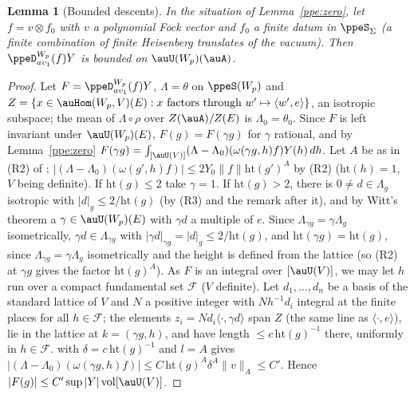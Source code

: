 \documentclass[10pt]{amsart}
\newtheorem{lemma}[theorem]{Lemma}
\theoremstyle{definition}
\theoremstyle{remark}
\begin{document}
\begin{lemma}[Bounded descents]\label{ppe:bdd}
In the situation of Lemma~\textup{\ref{ppe:zero}}, let $f=v\otimes f_0$ with $v$ a polynomial Fock
vector and $f_0$ a finite datum in $\ppeS_\Sigma$ (a finite combination of finite Heisenberg
translates of the vacuum). Then $\ppeD^{W_p}_{a\upsilon_1}(f)Y$ is bounded on $\auU(W_p)(\auA)$.
\end{lemma}
\begin{proof}
Let $F=\ppeD^{W_p}_{a\upsilon_1}(f)Y$, $\Lambda=\theta$ on $\ppeS(W_p)$ and $Z=\{x\in\auHom(W_p,V)(E):
x\text{ factors through }w'\mapsto\langle w',e\rangle\}$, an isotropic subspace; the mean of
$\Lambda\circ\rho$ over $Z(\auA)/Z(E)$ is $\Lambda_0=\theta_0$. Since $F$ is left invariant under
$\auU(W_p)(E)$, $F(g)=F(\gamma g)$ for $\gamma$ rational, and by Lemma~\ref{ppe:zero}
$F(\gamma g)=\int_{[\auU(V)]}(\Lambda-\Lambda_0)(\omega(\gamma g,h)f)Y(h)\,dh$. Let $A$ be as in (R2)
of {\cite[\S3.1.6]{P53}}; $|(\Lambda-\Lambda_0)(\omega(g',h)f)|\le2Y_0\|f\|\mathrm{ht}(g')^A$ by (R2)
($\mathrm{ht}(h)=1$, $V$ being definite). If $\mathrm{ht}(g)\le2$ take $\gamma=1$. If
$\mathrm{ht}(g)>2$, there is $0\ne d\in\Lambda_g$ isotropic with $|d|_g\le2/\mathrm{ht}(g)$ (by (R3)
and the remark after it), and by Witt's theorem a $\gamma\in\auU(W_p)(E)$ with $\gamma d$ a
multiple of $e$. Since $\Lambda_{\gamma g}=\gamma\Lambda_g$ isometrically, $\gamma d\in
\Lambda_{\gamma g}$ with $|\gamma d|_{\gamma g}=|d|_g\le2/\mathrm{ht}(g)$, and
$\mathrm{ht}(\gamma g)=\mathrm{ht}(g)$, since $\Lambda_{\gamma g}=\gamma\Lambda_g$ isometrically and the
height is defined from the lattice (so (R2) at $\gamma g$ gives the factor $\mathrm{ht}(g)^A$). As
$F$ is an integral over $[\auU(V)]$, we may let $h$ run over a compact fundamental set
$\mathcal F$ ($V$ definite). Let $d_1,\dots,d_n$ be a basis of the standard lattice of $V$ and $N$
a positive integer with $Nh^{-1}d_i$ integral at the finite places for all $h\in\mathcal F$; the
elements $z_i=Nd_i\langle\cdot,\gamma d\rangle$ span $Z$ (the same line as $\langle\cdot,e\rangle$),
lie in the lattice at $k=(\gamma g,h)$, and have length $\le c\,\mathrm{ht}(g)^{-1}$ there,
uniformly in $h\in\mathcal F$. {\cite[Lemma~3.32]{P53}} with
$\delta=c\,\mathrm{ht}(g)^{-1}$ and $l=A$ gives $|(\Lambda-\Lambda_0)(\omega(\gamma g,h)f)|\le
C\,\mathrm{ht}(g)^A\delta^A\|v\|_A\le C'$. Hence $|F(g)|\le C'\sup|Y|\operatorname{vol}[\auU(V)]$.
\end{proof}
\end{document}
